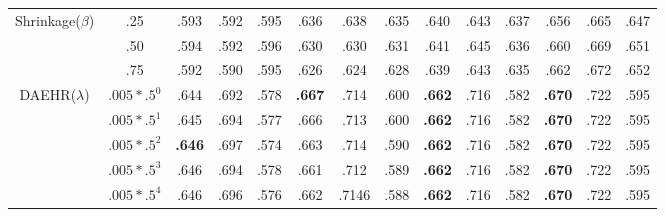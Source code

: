 \documentclass{article}
\begin{document}
\begin{table*}
{\begin{center}
\begin{tabular}{*{14}{c}}
    \multirow{3}{*}{Shrinkage($\beta$)} 
& .25 &   .593& .592 & .595 &     .636 & .638 & .635     & .640 & .643 & .637     & .656 & .665 & .647     \\
& .50 &   .594 & .592 & .596 &     .630 & .630 & .631   & .641 & .645 & .636     & .660 & .669 & .651    \\
& .75 &   .592 & .590 & .595 &     .626 & .624 & .628   & .639 & .643 & .635     & .662 & .672 & .652    \\
     \cmidrule(lr){1-2}                        
 \cmidrule(lr){3-5}
\cmidrule(lr){6-8}
\cmidrule(lr){9-11}
\cmidrule(lr){12-14}
     \multirow{5}{*}{DAEHR($\lambda$)} 
     & $.005*.5^{0}$ &   .644 & .692 & .578 &     \textbf{.667} & .714 & .600     & \textbf{.662} & .716 & .582    & \textbf{.670} & .722 & .595   \\
     & $.005*.5^{1}$ &   .645 & .694 & .577 &     .666 & .713 & .600     & \textbf{.662} & .716 & .582   & \textbf{.670} & .722 & .595   \\     
     & $.005*.5^{2}$ &   \textbf{.646} & .697 & .574 &   .663 & .714 & .590     & \textbf{.662} & .716 & .582    & \textbf{.670} & .722 & .595 \\
     & $.005*.5^{3}$ &   .646 & .694 & .578 &     .661 & .712 & .589     & \textbf{.662} & .716 & .582     & \textbf{.670} & .722 & .595    \\
     & $.005*.5^{4}$ &   .646 & .696 & .576 &     .662 & .7146 & .588     & \textbf{.662} & .716 & .582    & \textbf{.670} & .722 & .595 \\
     
     \bottomrule
 
\end{tabular}

\end{center}
}
\end{table*}
\end{document}
